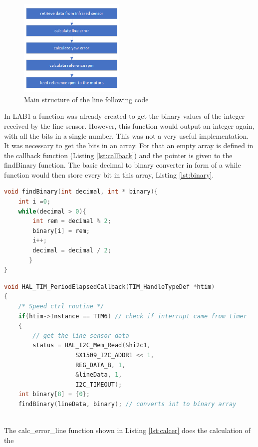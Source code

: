 \documentclass[english]{article}
\begin{document}
\begin{figure}[!h]
    \centering
    \includegraphics[width=0.45\textwidth, height=0.25\textheight]{figures/procedure.png}
    \caption{Main structure of the line following code}
    \label{fig:pro}
\end{figure}
\newpage
In LAB1 a function was already created to get the binary values of the integer received by the line sensor. However, this function would output an integer again,
  with all the bits in a single number. This was not a very useful implementation.
  It was necessary to get the bits in an array. For that an empty array is defined in the callback
 function (Listing \ref{lst:callback}) and the pointer is given to the findBinary function. The basic
 decimal to binary converter in form of a while function would then store every bit in
  this array, Listing \ref{lst:binary}.
\begin{lstlisting}[language=C, caption={converts integer to a binary array}, label={lst:binary} ]
void findBinary(int decimal, int * binary){
    int i =0;
    while(decimal > 0){
        int rem = decimal % 2;
        binary[i] = rem;
        i++;
        decimal = decimal / 2;
       }
}
\end{lstlisting}
\begin{lstlisting}[language=C, caption={Top part of the timer callback function }, label={lst:callback} ]
    void HAL_TIM_PeriodElapsedCallback(TIM_HandleTypeDef *htim)
{
	/* Speed ctrl routine */
	if(htim->Instance == TIM6) // check if interrupt came from timer
	{
		// get the line sensor data
		status = HAL_I2C_Mem_Read(&hi2c1,
                    SX1509_I2C_ADDR1 << 1,
                    REG_DATA_B, 1,
                    &lineData, 1,
                    I2C_TIMEOUT);
    int binary[8] = {0};
    findBinary(lineData, binary); // converts int to binary array
    
\end{lstlisting}
The calc\_error\_line function shown in Listing \ref{lst:calcer} does the calculation of the 
\end{document}
